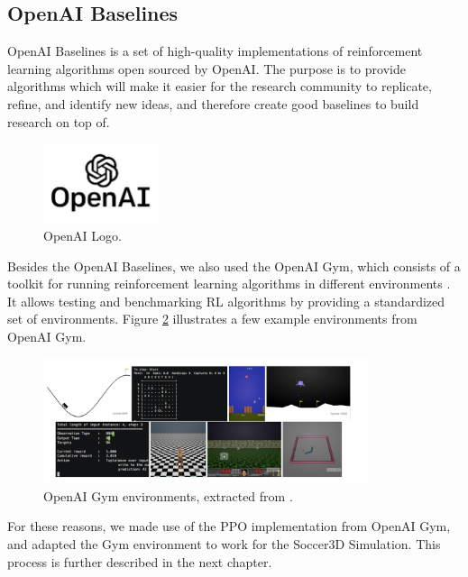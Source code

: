 \subsection{OpenAI Baselines}

OpenAI Baselines is a set of high-quality implementations of reinforcement learning algorithms open sourced by OpenAI. The purpose is to provide algorithms which will make it easier for the research community to replicate, refine, and identify new ideas, and therefore create good baselines to build research on top of. \cite{baselines}

\begin{figure}[H]
    \centering
    \includegraphics[width=0.3\textwidth]{Chapter5/openai_logo.jpg} 
    \caption{OpenAI Logo.}
    \label{fig:openai_logo}
\end{figure}

Besides the OpenAI Baselines, we also used the OpenAI Gym, which consists of a toolkit for running reinforcement learning algorithms in different environments \cite{OpenAIGym}. It allows testing and benchmarking RL algorithms by providing a standardized set of environments. Figure \ref{fig:openai_envs} illustrates a few example environments from OpenAI Gym.

\begin{figure}[H]
    \centering
    \includegraphics[width=0.85\textwidth]{Chapter5/openai_env.png} 
    \caption{OpenAI Gym environments, extracted from \cite{OpenAIGym}.}
    \label{fig:openai_envs}
\end{figure}

For these reasons, we made use of the PPO implementation from OpenAI Gym, and adapted the Gym environment to work for the Soccer3D Simulation. This process is further described in the next chapter.

